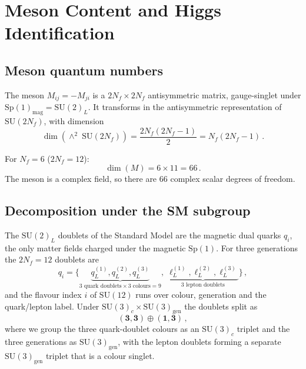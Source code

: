 \documentclass[11pt,a4paper]{article}
\theoremstyle{plain}
\theoremstyle{definition}
\theoremstyle{remark}
\newcommand{\Nf}{N_{\!f}}
\newcommand{\SU}[1]{\mathrm{SU}(#1)}
\newcommand{\Sp}[1]{\mathrm{Sp}(#1)}
\newcommand{\antisym}{\wedge^{\!2}}
\begin{document}
\section{Meson Content and Higgs Identification}
\label{sec:meson-higgs}

\subsection{Meson quantum numbers}

The meson $M_{ij} = -M_{ji}$ is a $2\Nf \times 2\Nf$ antisymmetric
matrix, gauge-singlet under $\Sp{1}_{\mathrm{mag}} = \SU{2}_L$.
It transforms in the antisymmetric representation of $\SU{2\Nf}$,
with dimension
\begin{equation}\label{eq:meson-dim}
  \dim(\antisym\;\SU{2\Nf}) = \frac{2\Nf(2\Nf - 1)}{2}
  = \Nf(2\Nf - 1)\,.
\end{equation}

For $\Nf = 6$ ($2\Nf = 12$):
\begin{equation}\label{eq:meson-66}
  \dim(M) = 6 \times 11 = 66\,.
\end{equation}
The meson is a complex field, so there are 66 complex scalar degrees of
freedom.

\subsection{Decomposition under the SM subgroup}

The $\SU{2}_L$ doublets of the Standard Model are the magnetic dual
quarks $q_i$, the only matter fields charged under the magnetic
$\Sp{1}$.  For three generations the $2\Nf = 12$ doublets are
\begin{equation}\label{eq:12-doublets}
  q_i = \bigl\{
    \underbrace{q_L^{(1)}, q_L^{(2)}, q_L^{(3)}}_{
      \text{3 quark doublets} \times \text{3 colours} = 9},\;
    \underbrace{\ell_L^{(1)}, \ell_L^{(2)}, \ell_L^{(3)}}_{
      \text{3 lepton doublets}}
  \bigr\}\,,
\end{equation}
and the flavour index $i$ of $\SU{12}$ runs over colour, generation and
the quark/lepton label.  Under $\SU{3}_c \times \SU{3}_{\mathrm{gen}}$
the doublets split as
\begin{equation}\label{eq:12-split}
  (\mathbf{3}, \mathbf{3}) \oplus (\mathbf{1}, \mathbf{3})\,,
\end{equation}
where we group the three quark-doublet colours as an $\SU{3}_c$
triplet and the three generations as $\SU{3}_{\mathrm{gen}}$, with
the lepton doublets forming a separate $\SU{3}_{\mathrm{gen}}$
triplet that is a colour singlet.
\end{document}
